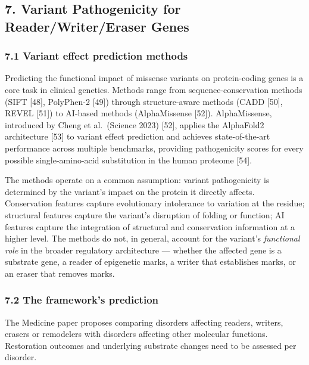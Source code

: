 \documentclass[
]{article}
\begin{document}
\hypertarget{variant-pathogenicity-for-readerwritereraser-genes}{%
\subsection{7. Variant Pathogenicity for Reader/Writer/Eraser
Genes}\label{variant-pathogenicity-for-readerwritereraser-genes}}

\hypertarget{variant-effect-prediction-methods}{%
\subsubsection{7.1 Variant effect prediction
methods}\label{variant-effect-prediction-methods}}

Predicting the functional impact of missense variants on protein-coding
genes is a core task in clinical genetics. Methods range from
sequence-conservation methods (SIFT {[}48{]}, PolyPhen-2 {[}49{]})
through structure-aware methods (CADD {[}50{]}, REVEL {[}51{]}) to
AI-based methods (AlphaMissense {[}52{]}). AlphaMissense, introduced by
Cheng et al.~(Science 2023) {[}52{]}, applies the AlphaFold2
architecture {[}53{]} to variant effect prediction and achieves
state-of-the-art performance across multiple benchmarks, providing
pathogenicity scores for every possible single-amino-acid substitution
in the human proteome {[}54{]}.

The methods operate on a common assumption: variant pathogenicity is
determined by the variant's impact on the protein it directly affects.
Conservation features capture evolutionary intolerance to variation at
the residue; structural features capture the variant's disruption of
folding or function; AI features capture the integration of structural
and conservation information at a higher level. The methods do not, in
general, account for the variant's \emph{functional role} in the broader
regulatory architecture --- whether the affected gene is a substrate
gene, a reader of epigenetic marks, a writer that establishes marks, or
an eraser that removes marks.

\hypertarget{the-frameworks-prediction}{%
\subsubsection{7.2 The framework's
prediction}\label{the-frameworks-prediction}}

The Medicine paper proposes comparing disorders affecting readers,
writers, erasers or remodelers with disorders affecting other molecular
functions. Restoration outcomes and underlying substrate changes need to
be assessed per disorder.
\end{document}
